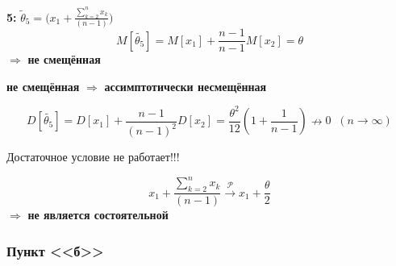 \textbf{5:}
$\tilde\theta_5 = \Big(x_1 + \frac{\sum\limits_{k=2}^n x_k}{(n-1)}\Big)$
\begin{equation*}
    M\left[\tilde{\theta_5}\right] = M[x_1] + \frac{n-1}{n-1}M[x_2] = \theta
\end{equation*}
$\Rightarrow$ \textbf{не смещённая}
\vspace{1.5 mm} \\
\begin{center}
    \textbf{не смещённая} $\Rightarrow$ \textbf{ассимптотически несмещённая}
\end{center}
\vspace{1.5mm}
\begin{equation*}  
    D\left[\tilde{\theta_5}\right] = D[x_1] + \frac{n-1}{(n-1)^2}D[x_2]
    = \frac{\theta^2}{12}\left(1 + \frac{1}{n-1}\right) \nrightarrow 0 \;\;(n\to\infty)
\end{equation*}
\vspace{1.5mm}
\begin{center}
    Достаточное условие не работает!!!
\end{center}
\vspace{1.5mm}
\begin{equation*}
    x_1 + \frac{\sum\limits_{k=2}^n x_k}{(n-1)}
    \xrightarrow[]{\mathcal{P}} x_1 + \frac{\theta}{2}
\end{equation*}
$\Rightarrow$ \textbf{не является состоятельной}


\newpage
\vspace{1cm}
\subsubsection{Пункт <<б>>}

